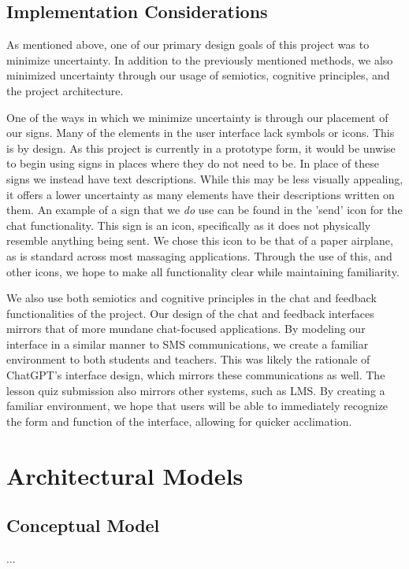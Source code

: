 \documentclass[12pt,a4paper]{article}
\begin{document}
    \subsection{Implementation Considerations}

    As mentioned above, one of our primary design goals of this project was to minimize uncertainty.
    In addition to the previously mentioned methods, we also minimized uncertainty through our
    usage of semiotics, cognitive principles, and the project architecture.

    One of the ways in which we minimize uncertainty is through our placement of our signs.  Many
    of the elements in the user interface lack symbols or icons.  This is by design.  As this project
    is currently in a prototype form, it would be unwise to begin using signs in places where they do
    not need to be.  In place of these signs we instead have text descriptions.  While this may be
    less visually appealing, it offers a lower uncertainty as many elements have their descriptions
    written on them.  An example of a sign that we \textit{do} use can be found in the 'send' icon for the
    chat functionality.  This sign is an icon, specifically as it does not physically resemble anything
    being sent.  We chose this icon to be that of a paper airplane, as is standard across most
    massaging applications.  Through the use of this, and other icons, we hope to make all functionality
    clear while maintaining familiarity.

    We also use both semiotics and cognitive principles in the chat and feedback functionalities of
    the project.  Our design of the chat and feedback interfaces mirrors that of more mundane chat-focused
    applications.  By modeling our interface in a similar manner to SMS communications, we create a
    familiar environment to both students and teachers.  This was likely the rationale of ChatGPT's
    interface design, which mirrors these communications as well.  The lesson quiz submission also
    mirrors other systems, such as LMS.  By creating a familiar environment, we hope that users
    will be able to immediately recognize the form and function of the interface, allowing for
    quicker acclimation.

    \section{Architectural Models}

    \subsection{Conceptual Model}
    ...
\end{document}
